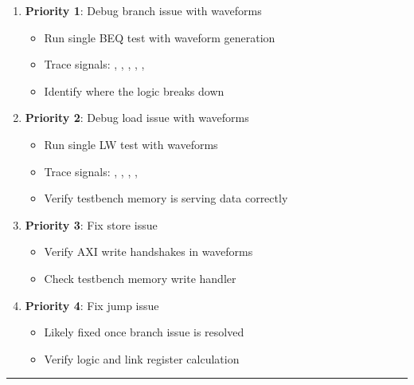 \begin{record}

\begin{enumerate}
\def\labelenumi{\arabic{enumi}.}
\item
  \textbf{Priority 1}: Debug branch issue with waveforms

  \begin{itemize}
  \tightlist
  \item
    Run single BEQ test with waveform generation
  \item
    Trace signals: , ,
    , , ,
  \item
    Identify where the logic breaks down
  \end{itemize}
\item
  \textbf{Priority 2}: Debug load issue with waveforms

  \begin{itemize}
  \tightlist
  \item
    Run single LW test with waveforms
  \item
    Trace signals: , ,
    , , 
  \item
    Verify testbench memory is serving data correctly
  \end{itemize}
\item
  \textbf{Priority 3}: Fix store issue

  \begin{itemize}
  \tightlist
  \item
    Verify AXI write handshakes in waveforms
  \item
    Check testbench memory write handler
  \end{itemize}
\item
  \textbf{Priority 4}: Fix jump issue

  \begin{itemize}
  \tightlist
  \item
    Likely fixed once branch issue is resolved
  \item
    Verify  logic and link register calculation
  \end{itemize}
\end{enumerate}

\begin{center}\rule{0.5\linewidth}{0.5pt}\end{center}

\end{record}

